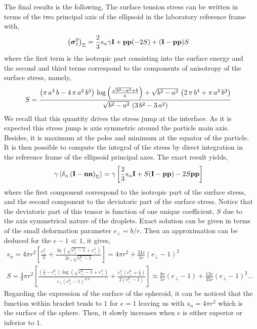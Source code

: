 The final results is the following, 
The surface tension stress can be written in terms of the two principal axis of the ellipsoid in the laboratory reference frame with, 
\begin{equation*}
    \left( \bm{\sigma}_I^0 \right)_\Sigma
    = \frac{2}{3} s_\alpha \gamma \textbf{I} + \textbf{pp} (-2 S)  + (\textbf{I} - \textbf{pp}){S}
\end{equation*}
where the first term is the isotropic part consisting into the surface energy and the second and third terms correspond to the components of anisotropy of the surface stress, namely, 
\begin{align*}
    S
    = 
    {{\left(\pi\,a^4\,b-4\,\pi\,a^2\,b^3\right)\,\log \left({{\sqrt{b^2
    -a^2}+b}\over{a}}\right)+\sqrt{b^2-a^2}\,\left(2\,\pi\,b^4+\pi\,a^2
    \,b^2\right)}\over{\sqrt{b^2-a^2}\,\left(3\,b^2-3\,a^2\right)}}
\end{align*}
We recall that this quantity drives the stress jump at the interface. 
As it is expected this stress jump is axis symmetric around the particle main axis. 
Besides, it is maximum at the poles and minimum at the equator of the particle. 
It is then possible to compute the integral of the stress by direct integration in the reference frame of the ellipsoid principal axes. 
The exact result yields, 
\begin{equation*}
    \gamma\left<\delta_\alpha \left( \textbf{I}-\textbf{nn} \right)_\Sigma\right>
    = \gamma \left[
        \frac{2}{3} s_\alpha \textbf{I}
        + S (\textbf{I}-\textbf{pp}) -2S\textbf{pp}
        \right]
\end{equation*}
where the first component correspond to the isotropic part of the surface stress, and the second component to the deviatoric part of the surface stress. 
Notice that the deviatoric part of this tensor is function of one unique coefficient, $S$ due to the axis symmetrical nature of the droplets. 
Exact solution can be given in terms of the small deformation parameter $e_\bot = b/r$. 
Then an approximation can be deduced for the $e -1 \ll 1$, it gives,
\begin{align*}
    s_\alpha 
    = 4\pi r^2 \left[\frac{e_\bot^2}{2} + \frac{\ln\left(\sqrt{{e_\bot^6}-1}+{e_\bot^3}\right)}{2e_\bot\sqrt{e_\bot^6-1}}\right]
    = 4 \pi r^2 + \frac{24 v }{5 r} (e_\bot-1)^2\\
    S = \frac{4}{3} \pi r^2 \left[
    \frac{\left( \frac{1}{4} - e_\bot^6\right)  \log{\left( \sqrt{e_\bot^6-1}+{e_\bot^3}\right) } }
    { e_\bot  \left( e_\bot^6- 1\right)^{3/2} }
    +  \frac{e_\bot^2\left( e_\bot^6+  \frac{1}{2}\right)}{2\left( e_\bot^6- 1\right)}  \right]
    \approx 
    \frac{8 v}{5 r}(e_\bot-1) + \frac{12 v }{35r}(e_\bot-1)^2 \ldots
\end{align*}
Regarding the expression of the surface of the spheroid, it can be noticed that the function within bracket tends to $1$ for $e=1$ leaving us with $s_\alpha = 4\pi r^2$ which is the surface of the sphere. 
Then, it slowly increases when $e$ is either superior or inferior to $1$. 

